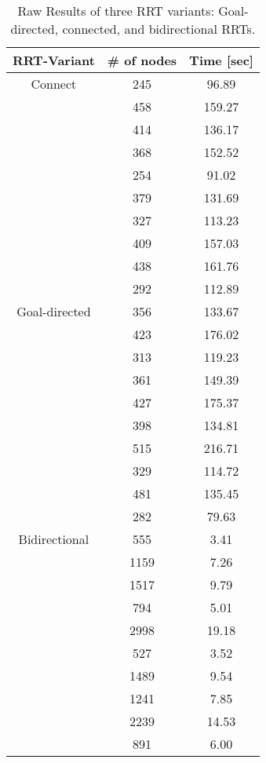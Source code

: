 \documentclass[12pt]{article}
\begin{document}
\begin{table}%
\centering
\label{table:results}
\caption{Raw Results of three RRT variants: Goal-directed, connected, and bidirectional RRTs.}
\begin{tabular*}{0.5\textwidth}{c|c|c}
\hline
\bfseries RRT-Variant & \bfseries \# of nodes & \bfseries Time [sec] \\
\hline\hline
Connect 	&  245 	& 96.89 	\\ \hline
		&  458 	& 159.27 	\\ \hline
		&  414 	& 136.17 	\\ \hline
		&  368 	& 152.52 	\\ \hline
		&  254 	& 91.02 	\\ \hline
		&  379 	& 131.69 	\\ \hline
		&  327 	& 113.23 	\\ \hline
		&  409 	& 157.03 	\\ \hline
		&  438 	& 161.76 	\\ \hline
		&  292 	& 112.89 	\\ \hline\hline
Goal-directed 	&  356 	& 133.67 	\\ \hline
		&  423 	& 176.02 	\\ \hline
		&  313 	& 119.23 	\\ \hline
		&  361 	& 149.39 	\\ \hline
		&  427 	& 175.37 	\\ \hline
		&  398 	& 134.81 	\\ \hline
		&  515 	& 216.71 	\\ \hline
		&  329 	& 114.72 	\\ \hline
		&  481 	& 135.45 	\\ \hline
		&  282 	& 79.63 	\\ \hline\hline
Bidirectional 	&  555 		& 3.41 	\\ \hline
		&  1159 	& 7.26 	\\ \hline
		&  1517 	& 9.79 	\\ \hline
		&  794 		& 5.01 	\\ \hline
		&  2998 	& 19.18 \\ \hline
		&  527 		& 3.52 	\\ \hline
		&  1489 	& 9.54 	\\ \hline
		&  1241 	& 7.85 	\\ \hline
		&  2239 	& 14.53 \\ \hline
		&  891 		& 6.00 	\\ \hline
\hline
\end{tabular*}
\end{table}
\end{document}
